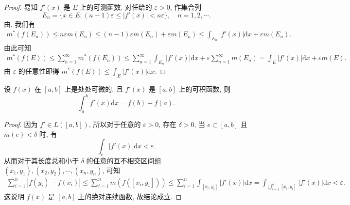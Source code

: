 \documentclass[../../main.tex]{subfiles}%
\begin{document}
\begin{proof}
易知 $f'(x)$ 是 $E$ 上的可测函数. 对任给的 $\varepsilon>0$, 作集合列
\[
E_n = \{x\in E: (n-1)\varepsilon\leqslant|f'(x)|<n\varepsilon\}, \quad n=1,2,\cdots.
\]
由, 我们有
\begin{align*}
m^*(f(E_n)) \leqslant n\varepsilon m(E_n) \leqslant (n-1)\varepsilon m(E_n) + \varepsilon m(E_n) 
\leqslant \int_{E_n} |f'(x)|\mathrm{d}x + \varepsilon m(E_n).
\end{align*}
由此可知
\begin{align*}
m^*(f(E)) \leqslant \sum_{n=1}^{\infty} m^*(f(E_n)) 
\leqslant \sum_{n=1}^{\infty} \int_{E_n} |f'(x)|\mathrm{d}x + \varepsilon \sum_{n=1}^{\infty} m(E_n) = \int_E |f'(x)|\mathrm{d}x + \varepsilon m(E).
\end{align*}
由 $\varepsilon$ 的任意性即得 $m^*(f(E))\leqslant\int_E |f'(x)|\mathrm{d}x$.
\end{proof}

\begin{proposition}
设 $f(x)$ 在 $[a,b]$ 上是处处可微的, 且 $f'(x)$ 是 $[a,b]$ 上的可积函数, 则
\[
\int_a^b f'(x)\mathrm{d}x = f(b)-f(a).
\]
\end{proposition}
\begin{proof}
因为 $f'\in L([a,b])$, 所以对于任意的 $\varepsilon>0$, 存在 $\delta>0$, 当 $e\subset[a,b]$ 且 $m(e)<\delta$ 时, 有
\[
\int_e |f'(x)|\mathrm{d}x < \varepsilon.
\]
从而对于其长度总和小于 $\delta$ 的任意的互不相交区间组 $(x_1,y_1), (x_2,y_2), \cdots, (x_n,y_n)$, 可知
\begin{align*}
\sum_{i=1}^n |f(y_i)-f(x_i)| \leqslant \sum_{i=1}^n m(f([x_i,y_i])) \leqslant \sum_{i=1}^n \int_{[x_i,y_i]} |f'(x)|\mathrm{d}x = \int_{\bigcup_{i=1}^n [x_i,y_i]} |f'(x)|\mathrm{d}x < \varepsilon.
\end{align*}
这说明 $f(x)$ 是 $[a,b]$ 上的绝对连续函数, 故结论成立.
\end{proof}
\end{document}
